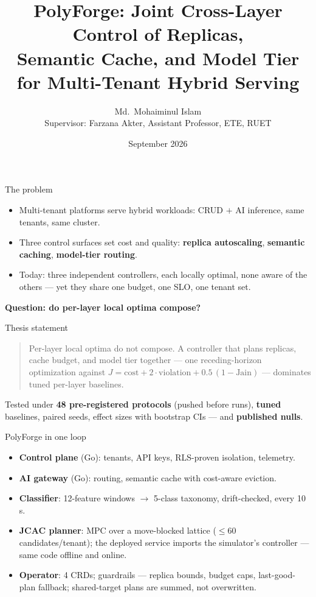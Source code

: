 \documentclass[aspectratio=169,11pt]{beamer}
\title{PolyForge: Joint Cross-Layer Control of Replicas,\\
Semantic Cache, and Model Tier for Multi-Tenant Hybrid Serving}
\author{Md.\ Mohaiminul Islam \\ {\small Supervisor: Farzana Akter, Assistant Professor, ETE, RUET}}
\date{September 2026}
\begin{document}
\maketitle

\begin{frame}{The problem}
  \begin{itemize}
    \item Multi-tenant platforms serve \alert{hybrid} workloads: CRUD $+$ AI
          inference, same tenants, same cluster.
    \item Three control surfaces set cost and quality: \textbf{replica
          autoscaling}, \textbf{semantic caching}, \textbf{model-tier
          routing}.
    \item Today: three independent controllers, each locally optimal, none
          aware of the others --- yet they share one budget, one SLO, one
          tenant set.
  \end{itemize}
  \vfill
  \textbf{Question: do per-layer local optima compose?}
\end{frame}

\begin{frame}{Thesis statement}
  \begin{quote}
    Per-layer local optima do \alert{not} compose. A controller that plans
    replicas, cache budget, and model tier \alert{together} --- one
    receding-horizon optimization against
    $J = \text{cost} + 2\cdot\text{violation} + 0.5\,(1-\text{Jain})$ ---
    dominates tuned per-layer baselines.
  \end{quote}
  \vfill
  Tested under \textbf{48 pre-registered protocols} (pushed before runs),
  \textbf{tuned} baselines, paired seeds, effect sizes with bootstrap CIs
  --- and \textbf{published nulls}.
\end{frame}

\begin{frame}{PolyForge in one loop}
  \begin{itemize}
    \item \textbf{Control plane} (Go): tenants, API keys, RLS-proven
          isolation, telemetry.
    \item \textbf{AI gateway} (Go): routing, semantic cache with cost-aware
          eviction.
    \item \textbf{Classifier}: 12-feature windows $\to$ 5-class taxonomy,
          drift-checked, every 10\,s.
    \item \textbf{JCAC planner}: MPC over a move-blocked lattice
          ($\le 60$ candidates/tenant); the deployed service \alert{imports
          the simulator's controller} --- same code offline and online.
    \item \textbf{Operator}: 4 CRDs; guardrails --- replica bounds, budget
          caps, last-good-plan fallback; shared-target plans are summed, not
          overwritten.
  \end{itemize}
\end{frame}
\end{document}
